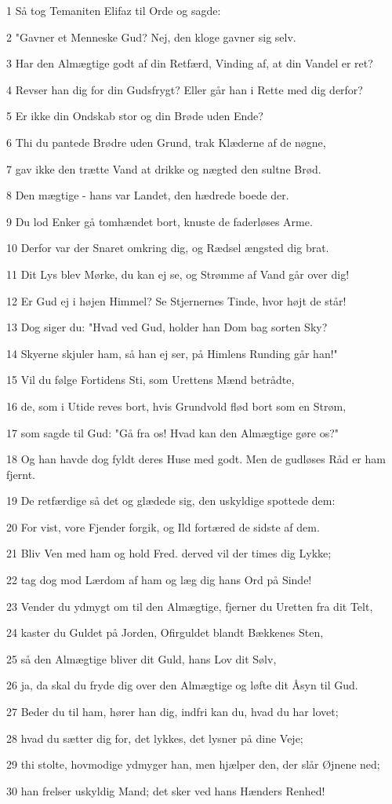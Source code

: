 \par 1 Så tog Temaniten Elifaz til Orde og sagde:
\par 2 "Gavner et Menneske Gud? Nej, den kloge gavner sig selv.
\par 3 Har den Almægtige godt af din Retfærd, Vinding af, at din Vandel er ret?
\par 4 Revser han dig for din Gudsfrygt? Eller går han i Rette med dig derfor?
\par 5 Er ikke din Ondskab stor og din Brøde uden Ende?
\par 6 Thi du pantede Brødre uden Grund, trak Klæderne af de nøgne,
\par 7 gav ikke den trætte Vand at drikke og nægted den sultne Brød.
\par 8 Den mægtige - hans var Landet, den hædrede boede der.
\par 9 Du lod Enker gå tomhændet bort, knuste de faderløses Arme.
\par 10 Derfor var der Snaret omkring dig, og Rædsel ængsted dig brat.
\par 11 Dit Lys blev Mørke, du kan ej se, og Strømme af Vand går over dig!
\par 12 Er Gud ej i højen Himmel? Se Stjernernes Tinde, hvor højt de står!
\par 13 Dog siger du: "Hvad ved Gud, holder han Dom bag sorten Sky?
\par 14 Skyerne skjuler ham, så han ej ser, på Himlens Runding går han!"
\par 15 Vil du følge Fortidens Sti, som Urettens Mænd betrådte,
\par 16 de, som i Utide reves bort, hvis Grundvold flød bort som en Strøm,
\par 17 som sagde til Gud: "Gå fra os! Hvad kan den Almægtige gøre os?"
\par 18 Og han havde dog fyldt deres Huse med godt. Men de gudløses Råd er ham fjernt.
\par 19 De retfærdige så det og glædede sig, den uskyldige spottede dem:
\par 20 For vist, vore Fjender forgik, og Ild fortæred de sidste af dem.
\par 21 Bliv Ven med ham og hold Fred. derved vil der times dig Lykke;
\par 22 tag dog mod Lærdom af ham og læg dig hans Ord på Sinde!
\par 23 Vender du ydmygt om til den Almægtige, fjerner du Uretten fra dit Telt,
\par 24 kaster du Guldet på Jorden, Ofirguldet blandt Bækkenes Sten,
\par 25 så den Almægtige bliver dit Guld, hans Lov dit Sølv,
\par 26 ja, da skal du fryde dig over den Almægtige og løfte dit Åsyn til Gud.
\par 27 Beder du til ham, hører han dig, indfri kan du, hvad du har lovet;
\par 28 hvad du sætter dig for, det lykkes, det lysner på dine Veje;
\par 29 thi stolte, hovmodige ydmyger han, men hjælper den, der slår Øjnene ned;
\par 30 han frelser uskyldig Mand; det sker ved hans Hænders Renhed!

